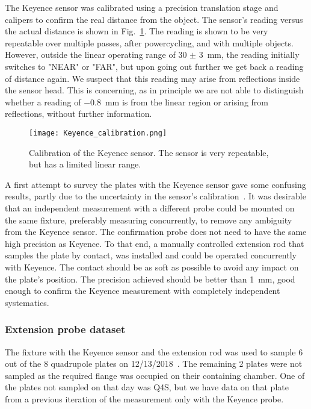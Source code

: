 The Keyence sensor was calibrated using a precision translation stage and calipers to confirm the real distance from the object.
The sensor's reading versus the actual distance is shown in Fig.~\ref{fig:Keyence_calibration}. The reading is shown to be very repeatable over multiple passes, after powercycling, and with multiple objects.
However, outside the linear operating range of 30 $\pm$ \SI{3}{mm}, the reading initially switches to "NEAR" or "FAR", but upon going out further we get back a reading of distance again. 
We suspect that this reading may arise from reflections inside the sensor head. 
This is concerning, as in principle we are not able to distinguish whether a reading of \eg \SI{-0.8}{mm} is from the linear region or arising from reflections, without further information.

\begin{figure}[]
	\centering
	\texttt{[image: Keyence\_calibration.png]}
	\caption{Calibration of the Keyence sensor. The sensor is very repeatable, but has a limited linear range.
	}\label{fig:Keyence_calibration}
\end{figure}


A first attempt to survey the plates with the Keyence sensor gave some confusing results, partly due to the uncertainty in the sensor's calibration~\cite{Kargiantoulakis:doc14776}.
It was desirable that an independent measurement with a different probe could be mounted on the same fixture, preferably measuring concurrently, to remove any ambiguity from the Keyence sensor.
The confirmation probe does not need to have the same high precision as Keyence.
To that end, a manually controlled extension rod that samples the plate by contact, was installed and could be operated concurrently with Keyence. The contact should be as soft as possible to avoid any impact on the plate's position.
The precision achieved should be better than \SI{1}{mm}, good enough to confirm the Keyence measurement with completely independent systematics.



\subsubsection{\label{Keyence_data} Extension probe dataset}

The fixture with the Keyence sensor and the extension rod was used to sample 6 out of the 8 quadrupole plates on 12/13/2018~\cite{Kargiantoulakis:doc15679}. The remaining 2 plates were not sampled as the required flange was occupied on their containing chamber. 
One of the plates not sampled on that day was Q4S, but we have data on that plate from a previous iteration of the measurement only with the Keyence probe.


